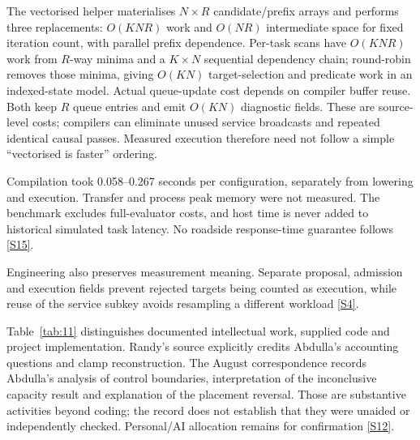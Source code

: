 \documentclass[11pt,a4paper]{article}
\begin{document}
The vectorised helper materialises $N\times R$ candidate/prefix arrays and performs three replacements: $O(KNR)$ work and $O(NR)$ intermediate space for fixed iteration count, with parallel prefix dependence. Per-task scans have $O(KNR)$ work from $R$-way minima and a $K\times N$ sequential dependency chain; round-robin removes those minima, giving $O(KN)$ target-selection and predicate work in an indexed-state model. Actual queue-update cost depends on compiler buffer reuse. Both keep $R$ queue entries and emit $O(KN)$ diagnostic fields. These are source-level costs; compilers can eliminate unused service broadcasts and repeated identical causal passes. Measured execution therefore need not follow a simple ``vectorised is faster'' ordering.

Compilation took 0.058--0.267 seconds per configuration, separately from lowering and execution. Transfer and process peak memory were not measured. The benchmark excludes full-evaluator costs, and host time is never added to historical simulated task latency. No roadside response-time guarantee follows \hyperref[source-s15]{[S15]}.

Engineering also preserves measurement meaning. Separate proposal, admission and execution fields prevent rejected targets being counted as execution, while reuse of the service subkey avoids resampling a different workload \hyperref[source-s4]{[S4]}.

Table~\ref{tab:11} distinguishes documented intellectual work, supplied code and project implementation. Randy's source explicitly credits Abdulla's accounting questions and clamp reconstruction. The August correspondence records Abdulla's analysis of control boundaries, interpretation of the inconclusive capacity result and explanation of the placement reversal. Those are substantive activities beyond coding; the record does not establish that they were unaided or independently checked. Personal/AI allocation remains for confirmation \hyperref[source-s12]{[S12]}.
\end{document}
